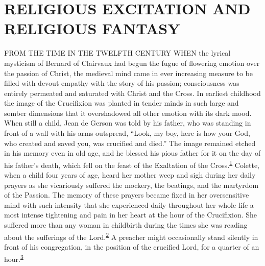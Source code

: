 \chapter{RELIGIOUS EXCITATION AND RELIGIOUS FANTASY}

FROM THE TIME IN THE TWELFTH CENTURY WHEN the lyrical mysticism of
Bernard of Clairvaux had begun the fugue of flowering emotion over the
passion of Christ, the medieval mind came in ever increasing measure to
be filled with devout empathy with the story of his passion;
consciousness was entirely permeated and saturated with Christ and the
Cross. In earliest childhood the image of the Crucifixion was planted in
tender minds in such large and somber dimensions that it overshadowed
all other emotion with its dark mood. When still a child, Jean de Gerson
was told by his father, who was standing in front of a wall with his
arms outspread, ``Look, my boy, here is how your God, who created and
saved you, was crucified and died.'' The image remained etched in his
memory even in old age, and he blessed his pious father for it on the
day of his father's death, which fell on the feast of the Exaltation of
the
Cross.\textsuperscript{\protect\hypertarget{15_Chapter_Eight__RELIGIOUS_EXCITAT.xhtmlux5cux23id_905}{\protect\hyperlink{23_NOTES.xhtmlux5cux23id_906}{1}}}
Colette, when a child four years of age, heard her mother weep and sigh
during her daily prayers as she vicariously suffered the mockery, the
beatings, and the martyrdom of the Passion. The memory of these prayers
became fixed in her oversensitive mind with such intensity that she
experienced daily throughout her whole life a most intense tightening
and pain in her heart at the hour of the Crucifixion. She suffered more
than any woman in childbirth during the times she was reading about the
sufferings of the
Lord.\textsuperscript{\protect\hypertarget{15_Chapter_Eight__RELIGIOUS_EXCITAT.xhtmlux5cux23id_903}{\protect\hyperlink{23_NOTES.xhtmlux5cux23id_904}{2}}}
A preacher might occasionally stand silently in front of his
congregation, in the position of the crucified Lord, for a quarter of an
hour.\textsuperscript{\protect\hypertarget{15_Chapter_Eight__RELIGIOUS_EXCITAT.xhtmlux5cux23id_901}{\protect\hyperlink{23_NOTES.xhtmlux5cux23id_902}{3}}}

